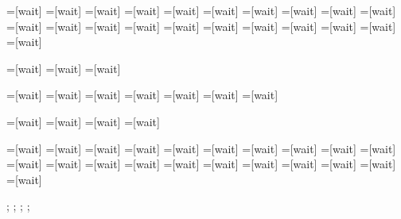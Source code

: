 

=[wait]	%
=[wait]	%
=[wait]	%
=[wait]	%
=[wait]	%
=[wait]	%
=[wait]	%
=[wait]	%
=[wait]	%
=[wait]	%
=[wait]	%
=[wait]	%
=[wait]	%
=[wait]	%
=[wait]	%
=[wait]	%
=[wait]	%
=[wait]	%
=[wait]	%
=[wait]	%
=[wait]	%

=[wait]	%
=[wait]	%
=[wait]	%

=[wait]	%
=[wait]	%
=[wait]	%
=[wait]	%
=[wait]	%
=[wait]	%
=[wait]	%

=[wait]	%
=[wait]	%
=[wait]	%
=[wait]	%

=[wait]	%
=[wait]	%
=[wait]	%
=[wait]	%
=[wait]	%
=[wait]	%
=[wait]	%
=[wait]	%
=[wait]	%
=[wait]	%
=[wait]	%
=[wait]	%
=[wait]	%
=[wait]	%
=[wait]	%
=[wait]	%
=[wait]	%
=[wait]	%
=[wait]	%
=[wait]	%
=[wait]	%




\def\waitcount{0};
\def\Dwincount{0};
\def\waitcount{0};
\def\Rwincount{0};

